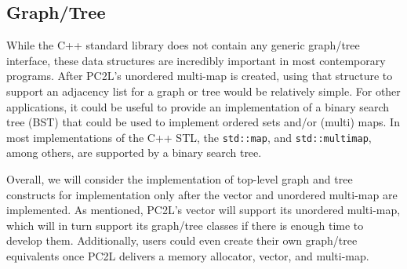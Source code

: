 \subsection{Graph/Tree}
While the C++ standard library does not contain any generic graph/tree interface, these data structures are incredibly important in most contemporary programs. After PC2L's unordered multi-map is created, using that structure to support an adjacency list for a graph or tree would be relatively simple. For other applications, it could be useful to provide an implementation of a binary search tree (BST) that could be used to implement ordered sets and/or (multi) maps. In most implementations of the C++ STL, the \texttt{std::map}, and \texttt{std::multimap}, among others, are supported by a binary search tree. 

Overall, we will consider the implementation of top-level graph and tree constructs for implementation only after the vector and unordered multi-map are implemented. As mentioned, PC2L's vector will support its unordered multi-map, which will in turn support its graph/tree classes if there is enough time to develop them. Additionally, users could even create their own graph/tree equivalents once PC2L delivers a memory allocator, vector, and multi-map.  

